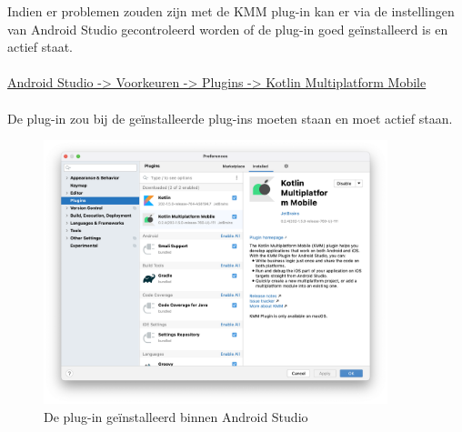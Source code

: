     Indien er problemen zouden zijn met de KMM plug-in kan er via de instellingen van Android Studio gecontroleerd worden of de plug-in goed geïnstalleerd is en actief staat.
    \\ \\
    \underline{Android Studio -> Voorkeuren -> Plugins -> Kotlin Multiplatform Mobile}
    \\ \\
    De plug-in zou bij de geïnstalleerde plug-ins moeten staan en moet actief staan.
    \begin{figure}
        \centering
        \includegraphics[width=10cm]{img/kmm-plugin-4.png}
        \caption{De plug-in geïnstalleerd binnen Android Studio}
        \label{fig:M-kmm-plugin-4}
    \end{figure}
   
   

